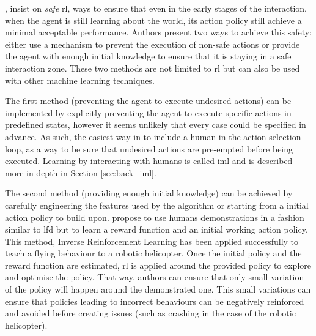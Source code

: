 	\cite{garcia2015comprehensive}, insist on \textit{safe} \gls{rl}, ways to ensure that even in the early stages of the interaction, when the agent is still learning about the world, its action policy still achieve a minimal acceptable performance. Authors present two ways to achieve this safety: either use a mechanism to prevent the execution of non-safe actions or provide the agent with enough initial knowledge to ensure that it is staying in a safe interaction zone. These two methods are not limited to \gls{rl} but can also be used with other machine learning techniques. 
	
	The first method (preventing the agent to execute undesired actions) can be implemented by explicitly preventing the agent to execute specific actions in predefined states, however it seems unlikely that every case could be specified in advance. As such, the easiest way in to include a human in the action selection loop, as a way to be sure that undesired actions are pre-empted before being executed. Learning by interacting with humans is called \acrlong{iml} and is described more in depth in Section \ref{sec:back_iml}.
	
	The second method (providing enough initial knowledge) can be achieved by carefully engineering the features used by the algorithm or starting from a initial action policy to build upon. \cite{Abbeel2004} propose to use humans demonstrations in a fashion similar to \gls{lfd} but to learn a reward function and an initial working action policy. This method, Inverse Reinforcement Learning has been applied successfully to teach a flying behaviour to a robotic helicopter. Once the initial policy and the reward function are estimated, \gls{rl} is applied around the provided policy to explore and optimise the policy. That way, authors can ensure that only small variation of the policy will happen around the demonstrated one. This small variations can ensure that policies leading to incorrect behaviours can be negatively reinforced and avoided before creating issues (such as crashing in the case of the robotic helicopter).
	
	
